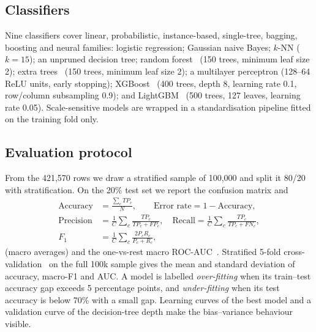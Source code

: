 \subsection{Classifiers}
Nine classifiers cover linear, probabilistic, instance-based, single-tree, bagging, boosting and neural families: logistic regression; Gaussian naive Bayes; $k$-NN ($k=15$); an unpruned decision tree; random forest~\cite{breiman2001} (150 trees, minimum leaf size 2); extra trees~\cite{geurts2006} (150 trees, minimum leaf size 2); a multilayer perceptron (128--64 ReLU units, early stopping); XGBoost~\cite{chen2016xgb} (400 trees, depth 8, learning rate 0.1, row/column subsampling 0.9); and LightGBM~\cite{ke2017} (500 trees, 127 leaves, learning rate 0.05). Scale-sensitive models are wrapped in a standardisation pipeline fitted on the training fold only.

\subsection{Evaluation protocol}
From the 421{,}570 rows we draw a stratified sample of 100{,}000 and split it 80/20 with stratification. On the 20\% test set we report the confusion matrix and
\begin{align}
\text{Accuracy}&=\tfrac{\sum_c TP_c}{N},\qquad \text{Error rate}=1-\text{Accuracy},\\
\text{Precision}&=\tfrac{1}{C}\sum_c\tfrac{TP_c}{TP_c+FP_c},\quad \text{Recall}=\tfrac{1}{C}\sum_c\tfrac{TP_c}{TP_c+FN_c},\\
F_1&=\tfrac{1}{C}\sum_c\tfrac{2P_cR_c}{P_c+R_c},
\end{align}
(macro averages) and the one-vs-rest macro ROC-AUC~\cite{fawcett2006}. Stratified 5-fold cross-validation~\cite{kohavi1995} on the full 100k sample gives the mean and standard deviation of accuracy, macro-F1 and AUC. A model is labelled \emph{over-fitting} when its train--test accuracy gap exceeds 5 percentage points, and \emph{under-fitting} when its test accuracy is below 70\% with a small gap. Learning curves of the best model and a validation curve of the decision-tree depth make the bias--variance behaviour visible.
